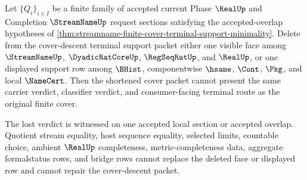 \begin{theorem}
\label{thm:streamname-finite-cover-terminal-support-removal-witness}
Let $\{Q_i\}_{i \in I}$ be a finite family of accepted current Phase
$\RealUp$ and Completion $\StreamNameUp$ request sections satisfying the
accepted-overlap hypotheses of
\autoref{thm:streamname-finite-cover-terminal-support-minimality}. Delete
from the cover-descent terminal support packet either one visible face among
$\StreamNameUp$, $\DyadicRatCoreUp$, $\RegSeqRatUp$, and $\RealUp$, or one
displayed support row among $\BHist$, componentwise $\hsame$, $\Cont$, $\Pkg$,
and local $\NameCert$. Then the shortened cover packet cannot present the same
carrier verdict, classifier verdict, and consumer-facing terminal route as the
original finite cover.

The lost verdict is witnessed on one accepted local section or accepted
overlap. Quotient stream equality, host sequence equality, selected limits,
countable choice, ambient $\RealUp$ completeness, metric-completeness data,
aggregate formalstatus rows, and bridge rows cannot replace the deleted face
or displayed row and cannot repair the cover-descent packet.
\end{theorem}
